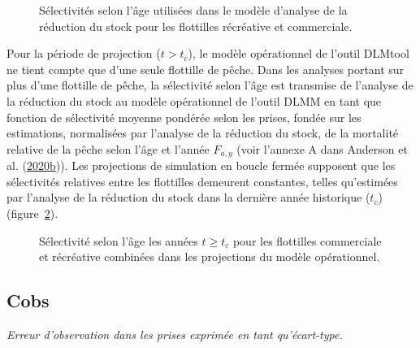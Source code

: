 \documentclass[11pt]{book}
\begin{document}
\begin{figure}[htb]

{\centering {} 

}

\caption{Sélectivités selon l'âge utilisées dans le modèle d'analyse de la réduction du stock pour les flottilles récréative et commerciale.}\label{fig:sra-selectivity}
\end{figure}
Pour la période de projection (\(t > t_c\)), le modèle opérationnel de l'outil DLMtool ne tient compte que d'une seule flottille de pêche. Dans les analyses portant sur plus d'une flottille de pêche, la sélectivité selon l'âge est transmise de l'analyse de la réduction du stock au modèle opérationnel de l'outil DLMM en tant que fonction de sélectivité moyenne pondérée selon les prises, fondée sur les estimations, normalisées par l'analyse de la réduction du stock, de la mortalité relative de la pêche selon l'âge et l'année \(F_{a,y}\) (voir l'annexe A dans Anderson et al. (\protect\hyperlink{ref-anderson2020gfmp}{2020}\protect\hyperlink{ref-anderson2020gfmp}{b})). Les projections de simulation en boucle fermée supposent que les sélectivités relatives entre les flottilles demeurent constantes, telles qu'estimées par l'analyse de la réduction du stock dans la dernière année historique (\(t_c\)) (figure~\ref{fig:om-selectivity}).


\begin{figure}[htb]

{\centering {} 

}

\caption{Sélectivité selon l'âge les années \(t \geq t_c\) pour les flottilles commerciale et récréative combinées dans les projections du modèle opérationnel.}\label{fig:om-selectivity}
\end{figure}
\clearpage

\label{app:desc-obs-yelloweye}

\label{app:desc-obs-cobs-yelloweye}
\subsection{Cobs}

\emph{Erreur d'observation dans les prises exprimée en tant qu'écart-type.}
\end{document}
